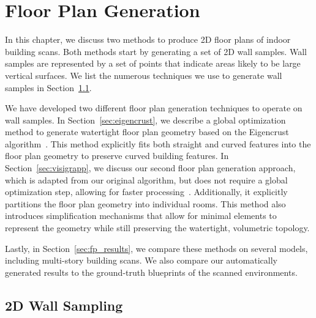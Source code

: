 \documentclass[12pt,onecolumn,oneside]{book}
\begin{document}

\chapter{Floor Plan Generation}
\label{ch:floorplan}

In this chapter, we discuss two methods to produce 2D floor plans of indoor building scans.  Both methods start by generating a set of 2D wall samples.  Wall samples are represented by a set of points that indicate areas likely to be large vertical surfaces.  We list the numerous techniques we use to generate wall samples in Section~\ref{sec:wall_sampling}.

We have developed two different floor plan generation techniques to operate on wall samples.  In Section~\ref{sec:eigencrust}, we describe a global optimization method to generate watertight floor plan geometry based on the Eigencrust algorithm~\cite{EigencrustShewchuk,Turner12}.  This method explicitly fits both straight and curved features into the floor plan geometry to preserve curved building features.  In Section~\ref{sec:visigrapp}, we discuss our second floor plan generation approach, which is adapted from our original algorithm, but does not require a global optimization step, allowing for faster processing~\cite{Turner14}.  Additionally, it explicitly partitions the floor plan geometry into individual rooms.  This method also introduces simplification mechanisms that allow for minimal elements to represent the geometry while still preserving the watertight, volumetric topology.

Lastly, in Section~\ref{sec:fp_results}, we compare these methods on several models, including multi-story building scans.  We also compare our automatically generated results to the ground-truth blueprints of the scanned environments.

\section{2D Wall Sampling}
\label{sec:wall_sampling}
\end{document}
